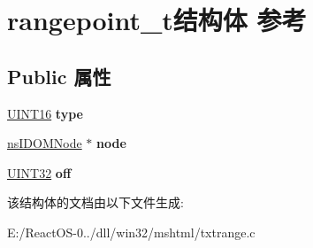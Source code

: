 \hypertarget{structrangepoint__t}{}\section{rangepoint\+\_\+t结构体 参考}
\label{structrangepoint__t}
\subsection*{Public 属性}
\begin{DoxyCompactItemize}
\item 
\mbox{\label{structrangepoint__t_a32b2be06ad63ac65866690d97ecce2d9}} 
\hyperlink{_processor_bind_8h_a09f1a1fb2293e33483cc8d44aefb1eb1}{U\+I\+N\+T16} {\bfseries type}
\item 
\mbox{\label{structrangepoint__t_a5456b360c31f17c17c37a13b0e175e1a}} 
\hyperlink{interfacens_i_d_o_m_node}{ns\+I\+D\+O\+M\+Node} $\ast$ {\bfseries node}
\item 
\mbox{\label{structrangepoint__t_a4daf120bf60e51d29b57bd956dbbab07}} 
\hyperlink{_processor_bind_8h_ae1e6edbbc26d6fbc71a90190d0266018}{U\+I\+N\+T32} {\bfseries off}
\end{DoxyCompactItemize}


该结构体的文档由以下文件生成\+:\begin{DoxyCompactItemize}
\item 
E\+:/\+React\+O\+S-\/0../dll/win32/mshtml/txtrange.\+c\end{DoxyCompactItemize}
